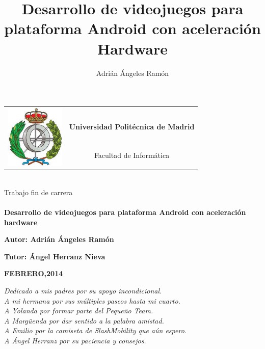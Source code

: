 \documentclass[12pt,a4paper]{memoir}
\author{Adrián Ángeles Ramón}
\title{Desarrollo de videojuegos para plataforma Android con aceleración Hardware}
\begin{document}
\pagestyle{empty}

\begin{tabular}{lc}
\multirow{3}{*}{\includegraphics[height=3cm]{imagenes/EscudoFacultad.jpg}} & \\
	                    									  &\textbf{{\LARGE Universidad Politécnica de Madrid}}\\[0.5cm]
												  & {\LARGE Facultad de Informática}\\[6cm]
\end{tabular}

\begin{center}
\hrulefill\\[0.3cm]
{\Large Trabajo fin de carrera}\\
\hrulefill\\[0.8cm]	

{\LARGE \textbf{Desarrollo de videojuegos para plataforma Android con aceleración hardware}}\\[6cm] 
\end{center}

\begin{center}
{\large \textbf{Autor: \hspace*{3mm}Adrián Ángeles Ramón}}
\end{center}
\begin{center}
\newline
{\large \textbf{Tutor: \hspace*{3mm}Ángel Herranz Nieva}}
\\[1cm]
\end{center}
\begin{center}
{\large {\color{gray45}\textbf{FEBRERO,2014}}}
\end{center}
\cleardoublepage

\renewcommand{\thepage}{\roman{page}}


\cleardoublepage

\vspace*{4cm}
\hspace*{5cm}\textit{Dedicado a mis padres por su apoyo incondicional.}\\
\hspace*{5cm}\textit{A mi hermana por sus múltiples paseos hasta mi cuarto.}\\
\hspace*{5cm}\textit{A Yolanda por formar parte del Pequeño Team.}\\
\hspace*{5cm}\textit{A Margüenda por dar sentido a la palabra amistad.}\\
\hspace*{5cm}\textit{A Emilio por la camiseta de SlashMobility que aún espero.}\\
\hspace*{5cm}\textit{A Ángel Herranz por su paciencia y consejos.}\\
\end{document}
